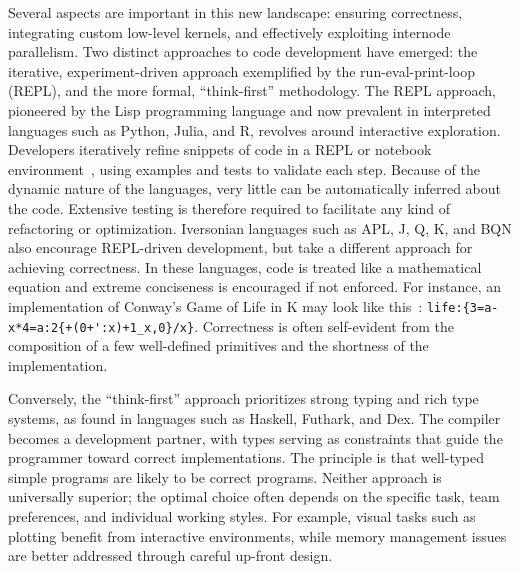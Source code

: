 Several aspects are important in this new landscape: ensuring correctness, integrating custom low-level kernels, and effectively exploiting internode parallelism. Two distinct approaches to code development have emerged: the iterative, experiment-driven approach exemplified by the run-eval-print-loop (REPL), and the more formal, ``think-first'' methodology. The REPL approach, pioneered by the Lisp programming language and now prevalent in interpreted languages such as Python, Julia, and R, revolves around interactive exploration. Developers iteratively refine snippets of code in a REPL or notebook environment~, using examples and tests to validate each step. Because of the dynamic nature of the languages, very little can be automatically inferred about the code. Extensive testing is therefore required to facilitate any kind of refactoring or optimization. Iversonian languages such as APL, J, Q, K, and BQN also encourage REPL-driven development, but take a different approach for achieving correctness. In these languages, code is treated like a mathematical equation and extreme conciseness is encouraged if not enforced. For instance, an implementation of Conway's Game of Life in K may look like this~: \verb|life:{3=a-x*4=a:2{+(0+':x)+1_x,0}/x}|. Correctness is often self-evident from the composition of a few well-defined primitives and the shortness of the implementation.

Conversely, the ``think-first'' approach prioritizes strong typing and rich type systems, as found in languages such as Haskell, Futhark, and Dex. The compiler becomes a development partner, with types serving as constraints that guide the programmer toward correct implementations. The principle is that well-typed simple programs are likely to be correct programs. Neither approach is universally superior; the optimal choice often depends on the specific task, team preferences, and individual working styles. For example, visual tasks such as plotting benefit from interactive environments, while memory management issues are better addressed through careful up-front design.

